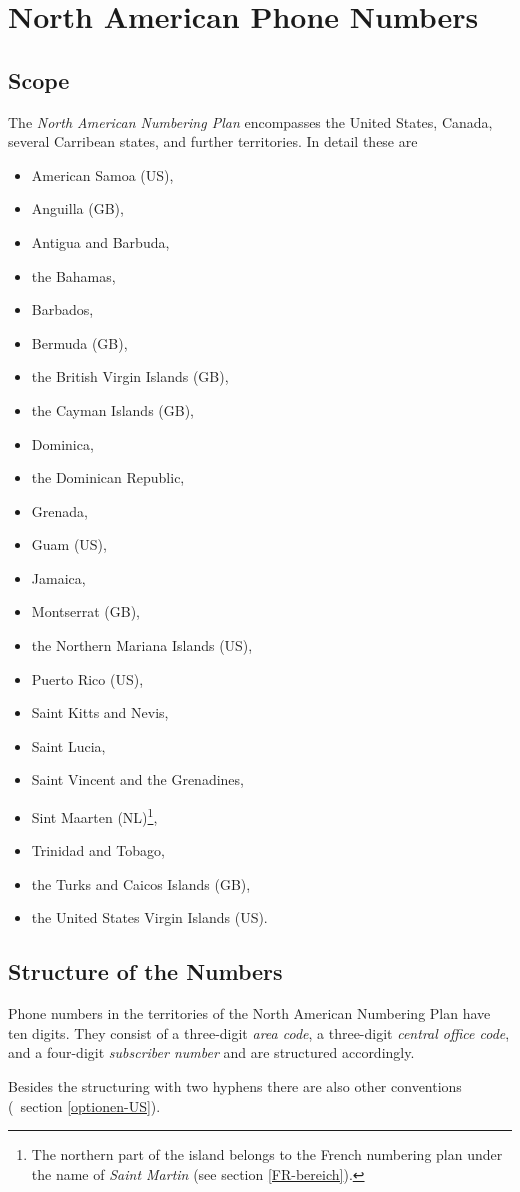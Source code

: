 \documentclass[numbers=noenddot]{scrreprt}
\newcommand\Abschnittsliteratur[1]{\bgroup
\small
\raggedright
\printbibliography[heading=subbibnumbered,keyword=#1]
\egroup}
\newcommand\UeberschriftGeltungsbereich{\section{Scope}}
\newcommand\UeberschriftAufbau{\section{Structure of the Numbers}}
\newcommand*\vglAbschnitt[1]{(\cf\ section \ref{#1})}
\newcommand*\sieheAbschnitt[1]{(see section \ref{#1})}
\begin{document}
\Abschnittsliteratur{british}

\chapter{North American Phone Numbers} \label{US}
\nocite{wikipedia-conventions-old}
\UeberschriftGeltungsbereich \label{US-bereich}
The \emph{North American Numbering Plan}
\cite{wikipedia-NANP}
encompasses the United States, Canada, several Carribean states, and further territories. In detail these are
\begin{itemize}
\item American Samoa (US),
\item Anguilla (GB),
\item Antigua and Barbuda,
\item the Bahamas,
\item Barbados,
\item Bermuda (GB),
\item the British Virgin Islands (GB),
\item the Cayman Islands (GB),
\item Dominica,
\item the Dominican Republic,
\item Grenada,
\item Guam (US),
\item Jamaica,
\item Montserrat (GB),
\item the Northern Mariana Islands (US),
\item Puerto Rico (US),
\item Saint Kitts and Nevis,
\item Saint Lucia,
\item Saint Vincent and the Grenadines,
\item Sint Maarten (NL)\footnote{The northern part of the island belongs to the French numbering plan under the name of \emph{Saint Martin}
\sieheAbschnitt{FR-bereich}.},
\item Trinidad and Tobago,
\item the Turks and Caicos Islands (GB),
\item the United States Virgin Islands (US).
\end{itemize}

\UeberschriftAufbau
Phone numbers in the territories of the North American Numbering Plan have ten digits. They consist of a three-digit \emph{area code}, a three-digit \emph{central office code}, and a four-digit \emph{subscriber number} and are structured accordingly.
\begin{sidebyside}
\end{sidebyside}
Besides the structuring with two hyphens there are also other conventions
\vglAbschnitt{optionen-US}.
\end{document}
